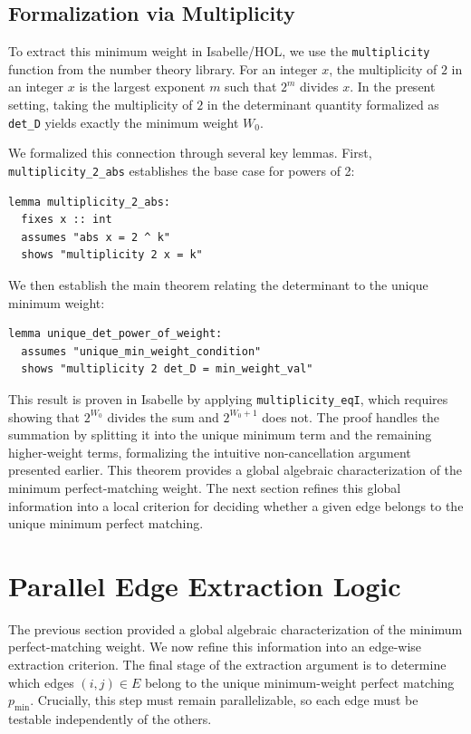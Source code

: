 \subsection{Formalization via Multiplicity}
To extract this minimum weight in Isabelle/HOL, we use the \texttt{multiplicity} function from the number theory library.
For an integer $x$, the multiplicity of $2$ in an integer $x$ is the largest exponent $m$ such that $2^m$ divides $x$.
In the present setting, taking the multiplicity of $2$ in the determinant quantity formalized as \texttt{det\_D} yields exactly the minimum weight $W_0$.

We formalized this connection through several key lemmas.
First, \texttt{multiplicity\_2\_abs} establishes the base case for powers of 2:

\listingneedspace
\begin{lstlisting}[language=Isabelle, caption={Multiplicity of Power of 2}]
lemma multiplicity_2_abs:
  fixes x :: int
  assumes "abs x = 2 ^ k"
  shows "multiplicity 2 x = k"
\end{lstlisting}

We then establish the main theorem relating the determinant to the unique minimum weight:

\begin{lstlisting}[language=Isabelle, caption={Multiplicity of Determinant}]
lemma unique_det_power_of_weight:
  assumes "unique_min_weight_condition"
  shows "multiplicity 2 det_D = min_weight_val"
\end{lstlisting}

This result is proven in Isabelle by applying \texttt{multiplicity\_eqI}, which requires showing that $2^{W_0}$ divides the sum and $2^{W_0+1}$ does not.
The proof handles the summation by splitting it into the unique minimum term and the remaining higher-weight terms, formalizing the intuitive non-cancellation argument presented earlier.
This theorem provides a global algebraic characterization of the minimum perfect-matching weight.
The next section refines this global information into a local criterion for deciding whether a given edge belongs to the unique minimum perfect matching.

\section{Parallel Edge Extraction Logic}
\label{sec:edge_extraction}

The previous section provided a global algebraic characterization of the minimum perfect-matching weight.
We now refine this information into an edge-wise extraction criterion.
The final stage of the extraction argument is to determine which edges $(i, j) \in E$ belong to the unique minimum-weight perfect matching $p_{\min}$.
Crucially, this step must remain parallelizable, so each edge must be testable independently of the others.

